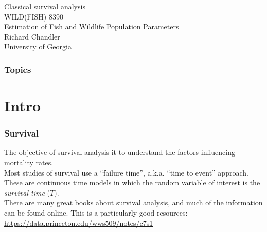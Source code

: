 \documentclass[color=usenames,dvipsnames]{beamer}\usepackage[]{graphicx}\usepackage[]{color}
\begin{document}
\begin{frame}[plain]
  \centering
  \LARGE
  Classical survival analysis \\
  \vfill
  \large
  WILD(FISH) 8390 \\
  Estimation of Fish and Wildlife Population Parameters \\
  \vfill
  Richard Chandler \\
  University of Georgia \\
\end{frame}







\begin{frame}[plain]
  \frametitle{Topics}
  \Large
\end{frame}




\section{Intro}





\begin{frame}
  \frametitle{Survival}
  \large
  The objective of survival analysis it to understand the factors
  influencing mortality rates. \\
  \pause
  \vfill
  Most studies of survival use a ``failure time'', a.k.a. ``time to event''
  approach. \\ 
  \pause
  \vfill
  These are continuous time models in which the random variable of
  interest is the {\it survival time} ($T$). \\
  \pause
  \vfill
  There are many great books about survival analysis, and much of the
  information can be found online. This is a particularly good
  resources: \\
  \vfill
  \centering
  \color{blue} \url{
    https://data.princeton.edu/wws509/notes/c7s1
  } \\
\end{frame}
\end{document}
